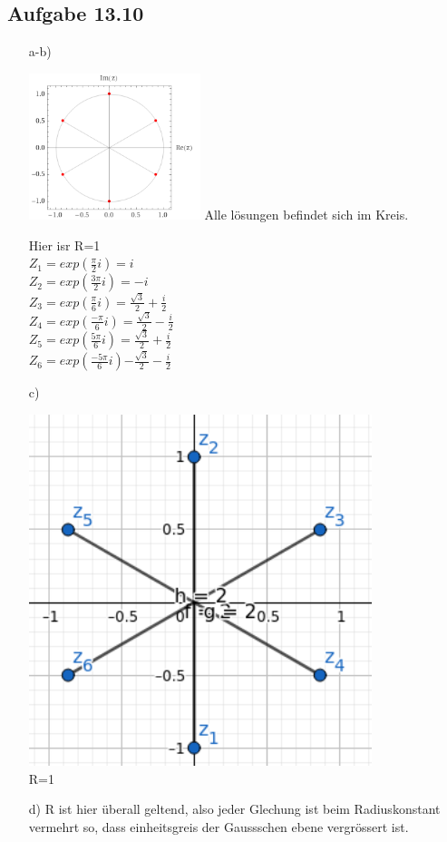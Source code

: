 \documentclass{standalone}
\begin{document}
\subsection{Aufgabe 13.10}
\begin{itemize}
	\item[a-b)]
		\begin{center}
		\includegraphics[width=5cm]{img/13_10.png}
		Alle lösungen befindet sich im Kreis.\\
	\end{center}
	Hier isr R=1\\
	$Z_1=exp(\frac{\pi}{2}i)=i$\\
	$Z_2=exp(\frac{3\pi}{2}i)=-i$\\
	$Z_3=exp(\frac{\pi}{6}i)=\frac{\sqrt{3}}{2}+\frac{i}{2}$\\
	$Z_4=exp(\frac{-\pi}{6}i)=\frac{\sqrt{3}}{2}-\frac{i}{2}$\\
	$Z_5=exp(\frac{5\pi}{6}i)$$=\frac{\sqrt{3}}{2}+\frac{i}{2}$\\
	$Z_6=exp(\frac{-5\pi}{6}i)$$-\frac{\sqrt{3}}{2}-\frac{i}{2}$\\
	
	\item[c)]
		\begin{center}
		\includegraphics[width=10cm]{img/13_10_c.png}\\
		R=1\\
	\end{center}
	\item[d)] R ist hier überall geltend, also jeder Glechung ist beim Radiuskonstant vermehrt so, dass einheitsgreis der Gaussschen ebene vergrössert ist.\\	
\end{itemize}
\end{document}
